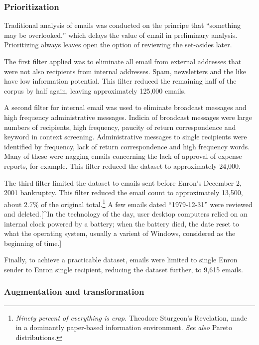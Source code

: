 \documentclass[]{article}
\let\rmarkdownfootnote\footnote%
\def\footnote{\protect\rmarkdownfootnote}
\begin{document}
\hypertarget{prioritization}{%
\subsubsection{Prioritization}\label{prioritization}}

Traditional analysis of emails was conducted on the principe that
``something may be overlooked,'' which delays the value of email in
preliminary analysis. Prioritizing always leaves open the option of
reviewing the set-asides later.

The first filter applied was to eliminate all email from external
addresses that were not also recipients from internal addresses. Spam,
newsletters and the like have low information potential. This filter
reduced the remaining half of the corpus by half again, leaving
approximately 125,000 emails.

A second filter for internal email was used to eliminate broadcast
messages and high frequency administrative messages. Indicia of
broadcast messages were large numbers of recipients, high frequency,
paucity of return correspondence and keyword in context screening.
Administrative messages to single recipients were identified by
frequency, lack of return correspondence and high frequency words. Many
of these were nagging emails concerning the lack of approval of expense
reports, for example. This filter reduced the dataset to approximately
24,000.

The third filter limited the dataset to emails sent before Enron's
December 2, 2001 bankruptcy. This filter reduced the email count to
approximately 13,500, about 2.7\% of the original total.\footnote{\emph{Ninety
  percent of everything is crap.} Theodore Sturgeon's Revelation, made
  in a dominantly paper-based information environment. \emph{See also}
  Pareto distributions.} A few emails dated ``1979-12-31'' were reviewed
and deleted.{[}\^{}In the technology of the day, user desktop computers
relied on an internal clock powered by a battery; when the battery died,
the date reset to what the operating system, usually a varient of
Windows, considered as the beginning of time.{]}

Finally, to achieve a practicable dataset, emails were limited to single
Enron sender to Enron single recipient, reducing the dataset further, to
9,615 emails.

\hypertarget{augmentation-and-transformation}{%
\subsubsection{Augmentation and
transformation}\label{augmentation-and-transformation}}
\end{document}
